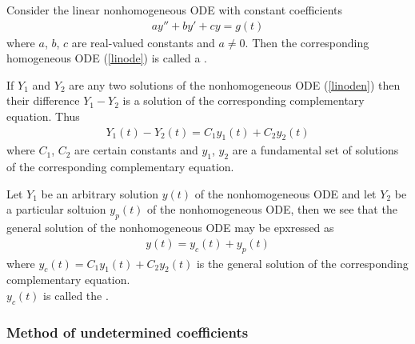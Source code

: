 \documentclass{article}
\begin{document}
\begin{definition}
    Consider the linear nonhomogeneous ODE with constant coefficients
    \begin{align}
        \label{linoden}
        ay'' + by' + cy = g(t)
    \end{align}
    where $a$, $b$, $c$ are real-valued constants and $a\not=0$. Then 
    the corresponding homogeneous ODE (\ref{linode}) is called a
    .
\end{definition}

\begin{theorem}
    If $Y_1$ and $Y_2$ are any two solutions of the nonhomogeneous ODE
    (\ref{linoden}) then their difference $Y_1-Y_2$ is  a solution of the
    corresponding complementary equation. Thus
    \begin{align*}
        Y_1(t) - Y_2(t) = C_1y_1(t) + C_2y_2(t)
    \end{align*}
    where $C_1$, $C_2$ are certain constants and $y_1$, $y_2$ are a
    fundamental set of solutions of the corresponding complementary equation.
\end{theorem}

\begin{theorem}
    Let $Y_1$ be an arbitrary solution $y(t)$ of the nonhomogeneous ODE
    and let $Y_2$ be a particular soltuion $y_p(t)$ of the nonhomogeneous
    ODE, then we see that the general solution of the nonhomogeneous ODE
    may be epxressed as
    \begin{align*}
        y(t) = y_c(t) + y_p(t)
    \end{align*}
    where $y_c(t) = C_1y_1(t) + C_2y_2(t)$ is the general solution of the
    corresponding complementary equation.\\
    $y_c(t)$ is called the . 
\end{theorem}

\subsubsection{Method of undetermined coefficients}
\end{document}

